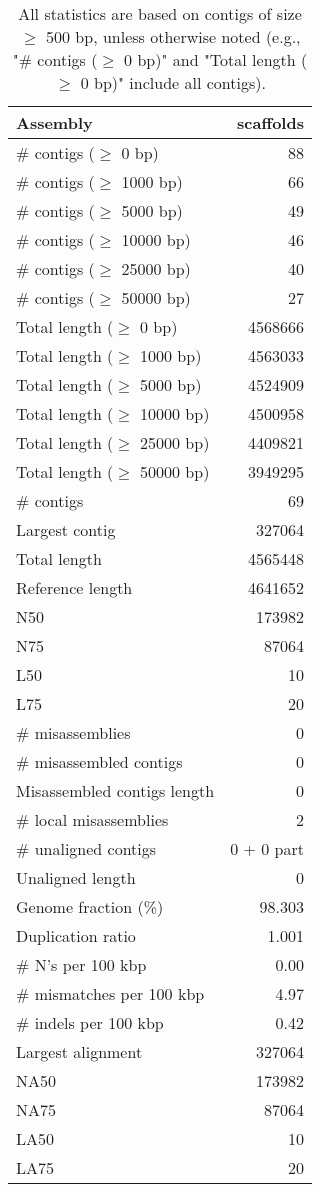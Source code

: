 \documentclass[12pt,a4paper]{article}
\begin{document}
\begin{table}[ht]
\begin{center}
\caption{All statistics are based on contigs of size $\geq$ 500 bp, unless otherwise noted (e.g., "\# contigs ($\geq$ 0 bp)" and "Total length ($\geq$ 0 bp)" include all contigs).}
\begin{tabular}{|l*{1}{|r}|}
\hline
Assembly & scaffolds \\ \hline
\# contigs ($\geq$ 0 bp) & 88 \\ \hline
\# contigs ($\geq$ 1000 bp) & 66 \\ \hline
\# contigs ($\geq$ 5000 bp) & 49 \\ \hline
\# contigs ($\geq$ 10000 bp) & 46 \\ \hline
\# contigs ($\geq$ 25000 bp) & 40 \\ \hline
\# contigs ($\geq$ 50000 bp) & 27 \\ \hline
Total length ($\geq$ 0 bp) & 4568666 \\ \hline
Total length ($\geq$ 1000 bp) & 4563033 \\ \hline
Total length ($\geq$ 5000 bp) & 4524909 \\ \hline
Total length ($\geq$ 10000 bp) & 4500958 \\ \hline
Total length ($\geq$ 25000 bp) & 4409821 \\ \hline
Total length ($\geq$ 50000 bp) & 3949295 \\ \hline
\# contigs & 69 \\ \hline
Largest contig & 327064 \\ \hline
Total length & 4565448 \\ \hline
Reference length & 4641652 \\ \hline
N50 & 173982 \\ \hline
N75 & 87064 \\ \hline
L50 & 10 \\ \hline
L75 & 20 \\ \hline
\# misassemblies & 0 \\ \hline
\# misassembled contigs & 0 \\ \hline
Misassembled contigs length & 0 \\ \hline
\# local misassemblies & 2 \\ \hline
\# unaligned contigs & 0 + 0 part \\ \hline
Unaligned length & 0 \\ \hline
Genome fraction (\%) & 98.303 \\ \hline
Duplication ratio & 1.001 \\ \hline
\# N's per 100 kbp & 0.00 \\ \hline
\# mismatches per 100 kbp & 4.97 \\ \hline
\# indels per 100 kbp & 0.42 \\ \hline
Largest alignment & 327064 \\ \hline
NA50 & 173982 \\ \hline
NA75 & 87064 \\ \hline
LA50 & 10 \\ \hline
LA75 & 20 \\ \hline
\end{tabular}
\end{center}
\end{table}
\end{document}
